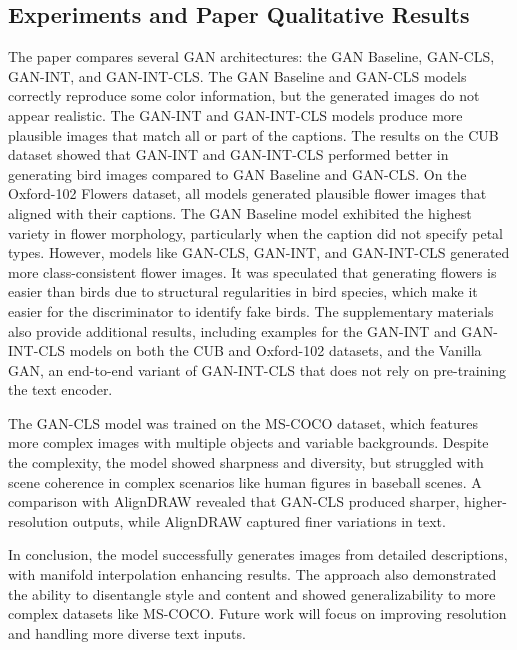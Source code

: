 
\subsection*{Experiments and Paper Qualitative Results}

The paper compares several GAN architectures: 
the GAN Baseline, GAN-CLS, GAN-INT, and GAN-INT-CLS. 
The GAN Baseline and GAN-CLS models correctly reproduce some color information, 
but the generated images do not appear realistic. 
The GAN-INT and GAN-INT-CLS models produce more plausible images that match all or part of the captions. 
The results on the CUB dataset showed that GAN-INT and GAN-INT-CLS performed better in generating bird images 
compared to GAN Baseline and GAN-CLS. 
On the Oxford-102 Flowers dataset, all models generated plausible flower images that aligned with their captions. 
The GAN Baseline model exhibited the highest variety in flower morphology, 
particularly when the caption did not specify petal types. 
However, models like GAN-CLS, GAN-INT, and GAN-INT-CLS generated more class-consistent flower images. 
It was speculated that generating flowers is easier than birds due to structural regularities 
in bird species, which make it easier for the discriminator to identify fake birds.
The supplementary materials also provide additional results, 
including examples for the GAN-INT and GAN-INT-CLS models on both the CUB and Oxford-102 datasets, 
and the Vanilla GAN, an end-to-end variant of GAN-INT-CLS that does not rely on pre-training the text encoder.

The GAN-CLS model was trained on the MS-COCO dataset, which features more complex images with multiple objects 
and variable backgrounds. Despite the complexity, 
the model showed sharpness and diversity, 
but struggled with scene coherence in complex scenarios like human figures in baseball scenes. 
A comparison with AlignDRAW revealed that GAN-CLS produced sharper, higher-resolution outputs, 
while AlignDRAW captured finer variations in text.

In conclusion, the model successfully generates images from detailed descriptions, 
with manifold interpolation enhancing results. The approach also demonstrated the ability 
to disentangle style and content and showed generalizability to more complex datasets like MS-COCO. 
Future work will focus on improving resolution and handling more diverse text inputs.
